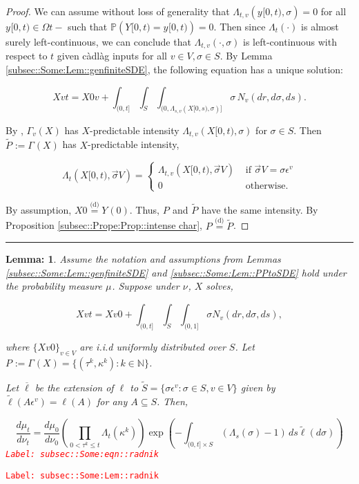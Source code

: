 \documentclass[12pt]{article}
\newcommand{\mb}{\mathbb}
\newcommand{\ov}{\overline}
\newcommand{\te}{\text}
\newcommand{\ep}{\epsilon}
\newcommand{\tr}{\textcolor{red}}
\newcommand{\labe}[1]{\tr{\texttt{Label: #1}}}
\newcommand{\ind}{\hspace{24pt}}
\newcommand{\lin}{\rule{\linewidth}{0.4 pt}}
\newcommand{\pr}{\mb{P}}							%
\newcommand{\deq}{\overset{\text{(d)}}{=}}			%
\newcommand{\defeq}{:=}								%
\renewcommand{\v}{v}							%
\renewcommand{\S}{S}							%
\newcommand{\s}{\sigma}							%
\newcommand{\sv}{\vec{\s}}						%
\newcommand{\ev}[1]{\ep^{#1}}					%
\renewcommand{\t}{t}							%
\renewcommand{\tt}{s}							%
\newcommand{\X}{X}								%
\newcommand{\poiss}[1]{N_{#1}}						%
\renewcommand{\r}{r}								%
\newcommand{\rt}[1]{\tau^{#1}}						%
\renewcommand{\it}{k}								%
\newcommand{\XState}[1]{\S^{#1}}				%
\newcommand{\rxvtt}[2]{Y_{#1}{(#2)}}				%
\newcommand{\xvtts}[2]{y_{#1}{#2}}					%
\newcommand{\rxvtts}[2]{Y_{#1}{#2}}					%
\newcommand{\rp}[1]{P^{#1}}							%
\newcommand{\m}[3]{\mu_{#2#1}^{#3}}						%
\newcommand{\mm}[3]{\nu_{#2#1}^{#3}}						%
\newcommand{\ratee}[1]{\Lambda_{#1}}				%
\newcommand{\Sm}{\ell}								%
\newcommand{\alt}{\widetilde}						%
\newcommand{\typset}{A}							%
\renewcommand{\mark}[1]{\kappa^{#1}}				%
\newcommand{\pmap}[1]{\Gamma_{#1}}				%
\newtheorem{lem}[thms]{Lemma: }
\begin{document}
\begin{proof}

We can assume without loss of generality that \(\ratee{\t,\v}(\xvtts{}{[0,\t)},\s) = 0\) for all \(\xvtts{}{[0,\t)}\in \Omega{}{\t-}\) such that \(\pr(\rxvtts{}{[0,\t)} = \xvtts{}{[0,\t)}) = 0\). Then since \(\ratee{\t}(\cdot)\) is almost surely left-continuous, we can conclude that \(\ratee{\t,\v}(\cdot,\s)\) is left-continuous with respect to \(\t\) given c\`adl\`ag inputs for all \(\v\in  V,\s\in\S\). By Lemma \ref{subsec::Some:Lem::genfiniteSDE}, the following equation has a unique solution:

\[\X{\v}{\t} = \X{0}{\v} + \int_{(0,\t]}\int_\S\int_{(0,\ratee{\tt,\v}(\X{}{[0,\tt)},\s)]}  \s\,\poiss{\v}(d\r,d\s,d\tt).\]

By \cite[Exercise 14.7.1]{DalVer08}, \(\pmap{\v}(\X{}{})\) has \(\X{}{}\)-predictable intensity \(\ratee{\t,\v}(\X{}{[0,\t)},\s)\) for \(\s \in \S\). Then \(\alt{\rp{}} \defeq \pmap{}(\X{}{})\) has \(\X{}{}\)-predictable intensity,

\[\ratee{\t}(\X{}{[0,\t)},\sv{}{ V}) = \begin{cases}
\ratee{\t,\v}(\X{}{[0,\t)},\sv{}{ V}) &\te{ if } \sv{}{ V} = \s\ev{\v}\\
0&\te{ otherwise.}
\end{cases}\]

By assumption, \(\X{}{0} \deq \rxvtt{}{0}\). Thus, \(\rp{}\) and \(\alt{\rp{}}\) have the same intensity. By Proposition \ref{subsec::Prope:Prop::intense char}, \(\rp{} \deq \alt{\rp{}}\).
\end{proof}
\lin

\begin{lem}
Assume the notation and assumptions from Lemmas \ref{subsec::Some:Lem::genfiniteSDE} and \ref{subsec::Some:Lem::PPtoSDE} hold under the probability measure \(\m{}{}{}\). Suppose under \(\mm{}{}{}\), \(\X{}{}\) solves,

\[\X{\v}{\t} = \X{\v}{0} +\int_{(0,\t]}\int_\S\int_{(0,1]} \s \poiss{\v}(d\r,d\s,d\tt),\]

where \(\{\X{\v}{0}\}_{\v \in  V}\) are i.i.d uniformly distributed over \(\S\). Let \(\rp{} \defeq \pmap{}(\X{}{}) = \{(\rt{\it},\mark{\it}):\it\in \mb{N}\}\).

\ind Let \(\ov{\ell}\) be the extension of \(\Sm\) to \(\alt{\S} = \{\s\ev{\v}: \s \in \S, \v \in  V\}\) given by \(\alt{\Sm}(\typset\ev{\v}) = \Sm(\typset)\) for any \(\typset \subseteq \S\). Then,

\begin{equation}
\frac{d\m{}{\t}{}}{d\mm{}{\t}{}}= \frac{d\m{}{0}{}}{d\mm{}{0}{}}\left(\prod_{0< \rt{\it}\leq t} \ratee{\t}(\mark{\it})\right)\exp\left(-\int_{(0,\t]\times \S} (\ratee{\tt}(\s) - 1)\,d\tt\alt{\Sm}(d\s)\right)
\label{subsec::Some:eqn::radnik}
\end{equation}
\labe{subsec::Some:eqn::radnik}
\label{subsec::Some:Lem::radnik}
\end{lem}
\labe{subsec::Some:Lem::radnik}
\end{document}
